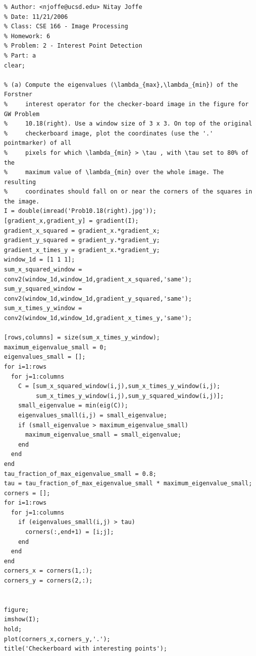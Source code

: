 \documentclass{article}
\begin{document}
\pagebreak
\begin{verbatim}
% Author: <njoffe@ucsd.edu> Nitay Joffe
% Date: 11/21/2006
% Class: CSE 166 - Image Processing
% Homework: 6
% Problem: 2 - Interest Point Detection
% Part: a
clear;

% (a) Compute the eigenvalues (\lambda_{max},\lambda_{min}) of the Forstner
%     interest operator for the checker-board image in the figure for GW Problem
%     10.18(right). Use a window size of 3 x 3. On top of the original
%     checkerboard image, plot the coordinates (use the '.' pointmarker) of all
%     pixels for which \lambda_{min} > \tau , with \tau set to 80% of the
%     maximum value of \lambda_{min} over the whole image. The resulting
%     coordinates should fall on or near the corners of the squares in the image.
I = double(imread('Prob10.18(right).jpg'));
[gradient_x,gradient_y] = gradient(I);
gradient_x_squared = gradient_x.*gradient_x;
gradient_y_squared = gradient_y.*gradient_y;
gradient_x_times_y = gradient_x.*gradient_y;
window_1d = [1 1 1];
sum_x_squared_window = conv2(window_1d,window_1d,gradient_x_squared,'same');
sum_y_squared_window = conv2(window_1d,window_1d,gradient_y_squared,'same');
sum_x_times_y_window = conv2(window_1d,window_1d,gradient_x_times_y,'same');

[rows,columns] = size(sum_x_times_y_window);
maximum_eigenvalue_small = 0;
eigenvalues_small = [];
for i=1:rows
  for j=1:columns
    C = [sum_x_squared_window(i,j),sum_x_times_y_window(i,j);
         sum_x_times_y_window(i,j),sum_y_squared_window(i,j)];
    small_eigenvalue = min(eig(C));
    eigenvalues_small(i,j) = small_eigenvalue;
    if (small_eigenvalue > maximum_eigenvalue_small)
      maximum_eigenvalue_small = small_eigenvalue;
    end
  end
end
tau_fraction_of_max_eigenvalue_small = 0.8;
tau = tau_fraction_of_max_eigenvalue_small * maximum_eigenvalue_small;
corners = [];
for i=1:rows
  for j=1:columns
    if (eigenvalues_small(i,j) > tau)
      corners(:,end+1) = [i;j];
    end
  end
end
corners_x = corners(1,:);
corners_y = corners(2,:);


figure;
imshow(I);
hold;
plot(corners_x,corners_y,'.');
title('Checkerboard with interesting points');
\end{verbatim}
\pagebreak
\end{document}
